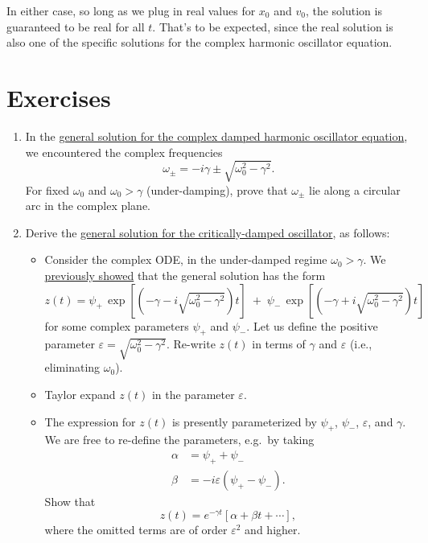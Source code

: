 \documentclass[10pt,a4paper]{article}
\begin{document}
In either case, so long as we plug in real values for $x_0$ and $v_0$,
the solution is guaranteed to be real for all $t$. That's to be
expected, since the real solution is also one of the specific
solutions for the complex harmonic oscillator equation.

\section{Exercises}\label{exercises}

\begin{enumerate}
\item
In the \hyperref[general-solution]{general solution for the complex
  damped harmonic oscillator equation}, we encountered the complex
frequencies
\begin{equation}
\omega_\pm = -i\gamma \pm \sqrt{\omega_0^2 - \gamma^2}.
\end{equation}For
fixed $\omega_0$ and $\omega_0 > \gamma$ (under-damping), prove that
$\omega_\pm$ lie along a circular arc in the complex plane.

\item
Derive the \hyperref[critical-damping]{general solution for the
  critically-damped oscillator}, as follows:

\begin{itemize}
\item Consider the complex ODE, in the under-damped regime $\omega_0 >
  \gamma$. We \hyperref[general-solution]{previously showed} that the
  general solution has the form
\begin{equation}
z(t) = \psi_+ \, \exp\left[\left(-\gamma  - i \sqrt{\omega_0^2 - \gamma^2}\right)t\right] \; +\; \psi_- \, \exp\left[\left(-\gamma +i\sqrt{\omega_0^2 - \gamma^2}\right)t\right]
\end{equation}
for some complex parameters $\psi_+$ and $\psi_-$. Let us define the
positive parameter $\varepsilon = \sqrt{\omega_0^2 - \gamma^2}$.
Re-write $z(t)$ in terms of $\gamma$ and $\varepsilon$ (i.e.,
eliminating $\omega_0$).

\item
Taylor expand $z(t)$ in the parameter $\varepsilon$.

\item
The expression for $z(t)$ is presently parameterized by $\psi_+$,
$\psi_-$, $\varepsilon$, and $\gamma$. We are free to re-define the
parameters, e.g.~by taking
\begin{align}
  \alpha &= \psi_+ + \psi_- \\ \beta &= -i\varepsilon(\psi_+ - \psi_-).
\end{align}
Show that
\begin{equation}
z(t) = e^{-\gamma t}\left[\alpha + \beta t + \cdots\right],
\end{equation}
where the omitted terms are of order $\varepsilon^2$ and higher.


\end{itemize}
\end{enumerate}
\end{document}

